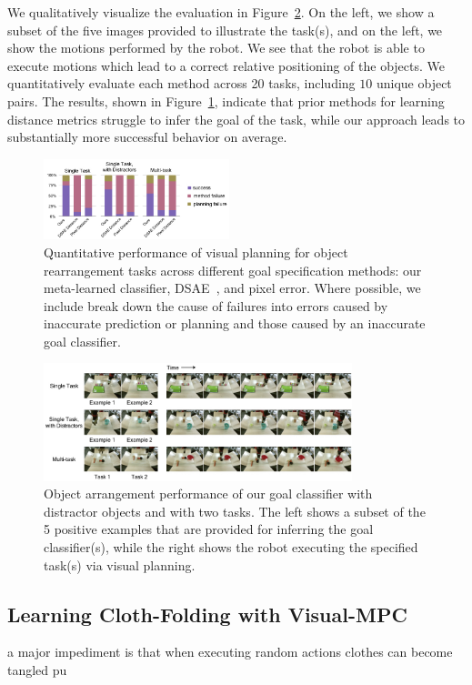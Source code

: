 We qualitatively visualize the evaluation in Figure~\ref{fig:cls_results}. On the left, we show a subset of the five images provided to illustrate the task(s), and on the left, we show the motions performed by the robot. We see that the robot is able to execute motions which lead to a correct relative positioning of the objects.
We quantitatively evaluate each method across 20 tasks, including $10$ unique object pairs. The results, shown in Figure~\ref{fig:cls_charts}, indicate that prior methods for learning distance metrics
struggle to infer the goal of the task, while our approach leads to substantially more successful behavior on average. 


\begin{figure}
    \centering
    \includegraphics[width=0.48\textwidth]{images_cls/cls_charts.jpeg}
    \caption{\small Quantitative performance of visual planning for object rearrangement tasks across different goal specification methods: our meta-learned classifier, DSAE~\cite{finn_nips}, and pixel error. Where possible, we include break down the cause of failures into errors caused by inaccurate prediction or planning and those caused by an inaccurate goal classifier.}
    \label{fig:cls_charts}
    \vspace{-0.3cm}
\end{figure}


\begin{figure}
    \centering
    \includegraphics[width=0.8\textwidth]{images_cls/cls_results.jpeg}
    \caption{\small Object arrangement performance of our goal classifier with distractor objects and with two tasks. The left shows a subset of the 5 positive examples that are provided for inferring the goal classifier(s), while the right shows the robot executing the specified task(s) via visual planning.}
    \label{fig:cls_results}
    \vspace{-0.3cm}
\end{figure}

\subsection{Learning Cloth-Folding with Visual-MPC}
\label{subsec:cloth_folding_data}
a major impediment is that when executing random actions clothes can become tangled pu